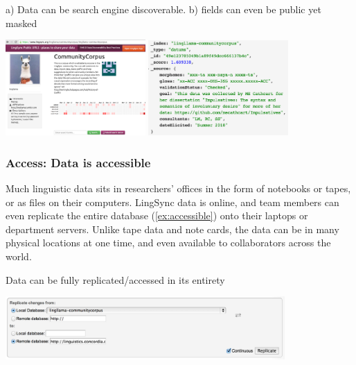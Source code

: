 \documentclass[letterpaper, 12pt, dvips]{mitwpl}
\begin{document}
\begin{exe} 
\ex a) Data can be search engine discoverable. b) fields can even be public yet masked 

\hspace{-1.5in}
 \centering
   \includegraphics[width=0.4\textwidth]{discoverable}
   \includegraphics[width=0.4\textwidth]{confidential}

\label{ex:discoverable}
\end{exe}


\subsubsection{\textbf{Access}: Data is accessible}
 
Much linguistic data sits in researchers' offices in the form of notebooks or tapes, or as files on their computers.  LingSync data is online, and team members can even replicate the entire database (\ref{ex:accessible}) onto their laptops or department servers. Unlike tape data and note cards, the data can be in many physical locations at one time, and even available to collaborators across the world. 

\begin{exe} 
\ex Data can be fully replicated/accessed in its entirety

 \centering
   \includegraphics[width=0.8\textwidth]{accessible}

\label{ex:accessible}
\end{exe}
\end{document}
